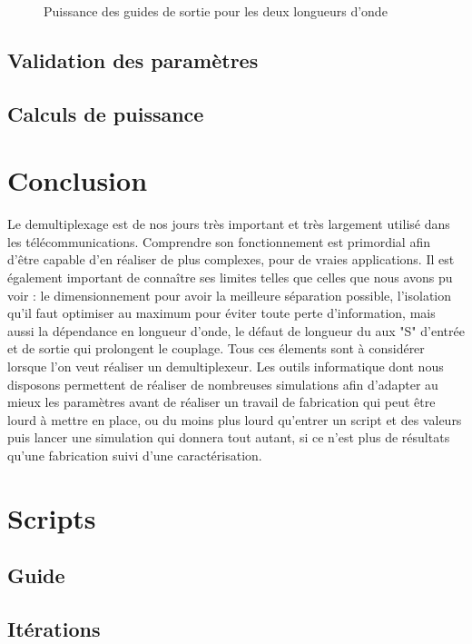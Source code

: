 \documentclass[a4paper,11pt]{report}
\begin{document}
\begin{figure}[h]
    \begin{center}
        \caption{Puissance des guides de sortie pour les deux longueurs d'onde}
        \label{fig:}
    \end{center}
\end{figure}

\section{Validation des paramètres}
\section{Calculs de puissance}
\chapter*{Conclusion}

Le demultiplexage est de nos jours très important et très largement utilisé dans les télécommunications. Comprendre son fonctionnement est primordial afin d'être capable d'en réaliser de plus complexes, pour de vraies applications. 
Il est également important de connaître ses limites telles que celles que nous avons pu voir : le dimensionnement pour avoir la meilleure séparation possible, l'isolation qu'il faut optimiser au maximum pour éviter toute perte d'information, mais aussi la dépendance en longueur d'onde, le défaut de longueur du aux "S" d'entrée et de sortie qui prolongent le couplage. Tous ces élements sont à considérer lorsque l'on veut réaliser un demultiplexeur. Les outils informatique dont nous disposons permettent de réaliser de nombreuses simulations afin d'adapter au mieux les paramètres avant de réaliser un travail de fabrication qui peut être lourd à mettre en place, ou du moins plus lourd qu'entrer un script et des valeurs puis lancer une simulation qui donnera tout autant, si ce n'est plus de résultats qu'une fabrication suivi d'une caractérisation. 

\appendix
\chapter{Scripts}
\section{Guide}
\section{Itérations}
\nocite{*}


\end{document}
